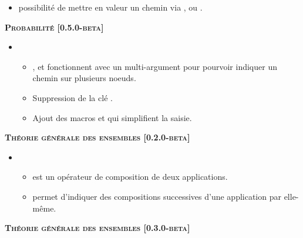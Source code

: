 \documentclass[12pt,a4paper]{book}
\begin{document}
\begin{description}
\begin{itemize}[itemsep=.5em]
    \item {}
    	  possibilité de mettre en valeur un chemin via ,   ou .
\end{itemize}


\begin{center}
    \textbf{\textsc{Probabilité [0.5.0-beta]}}
\end{center}

\begin{itemize}[itemsep=.5em]
    \item {}
    \begin{itemize}[itemsep=.5em]
        \item {},  et  fonctionnent avec un multi-argument pour pourvoir indiquer un chemin sur plusieurs noeuds.
        
        \item Suppression de la clé .
        
        \item Ajout des macros  et  qui simplifient la saisie.
    \end{itemize}
\end{itemize}


\separation




\begin{center}
    \textbf{\textsc{Théorie générale des ensembles [0.2.0-beta]}}
\end{center}

\begin{itemize}[itemsep=.5em]
    \item {}
    \begin{itemize}[itemsep=.5em]
        \item {} est un opérateur de composition de deux applications.

        \item {} permet d'indiquer des compositions successives d'une application par elle-même.
    \end{itemize}
\end{itemize}


\begin{center}
    \textbf{\textsc{Théorie générale des ensembles [0.3.0-beta]}}
\end{center}


\end{description}
\end{document}
